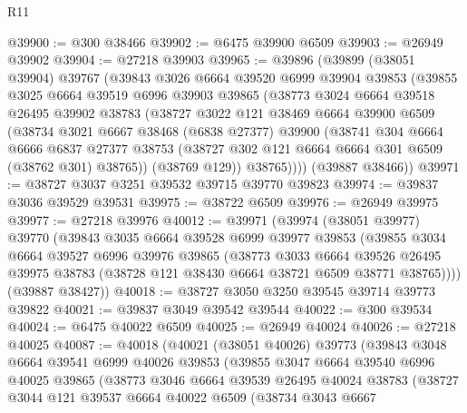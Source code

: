 \begin{lexlean}{R11}
\begin{coremodule}
@39900 := @300 @38466
@39902 := @6475 @39900 @6509
@39903 := @26949 @39902
@39904 := @27218 @39903
@39965 := @39896
    (@39899
      (@38051 @39904)
      @39767
      (@39843
        @3026
        @6664
        @39520
        @6999
        @39904
        @39853
        (@39855
          @3025
          @6664
          @39519
          @6996
          @39903
          @39865
          (@38773
            @3024
            @6664
            @39518
            @26495
            @39902
            @38783
            (@38727
              @3022
              @121
              @38469
              @6664
              @39900
              @6509
              (@38734
                @3021
                @6667
                @38468
                (@6838 @27377)
                @39900
                (@38741
                  @304
                  @6664
                  @6666
                  @6837
                  @27377
                  @38753
                  (@38727 @302 @121 @6664 @6664 @301 @6509 (@38762 @301) @38765))
                (@38769 @129))
              @38765))))
      (@39887 @38466))
@39971 := @38727 @3037 @3251 @39532 @39715 @39770 @39823
@39974 := @39837 @3036 @39529 @39531
@39975 := @38722 @6509
@39976 := @26949 @39975
@39977 := @27218 @39976
@40012 := @39971
    (@39974
      (@38051 @39977)
      @39770
      (@39843
        @3035
        @6664
        @39528
        @6999
        @39977
        @39853
        (@39855
          @3034
          @6664
          @39527
          @6996
          @39976
          @39865
          (@38773
            @3033
            @6664
            @39526
            @26495
            @39975
            @38783
            (@38728 @121 @38430 @6664 @38721 @6509 @38771 @38765))))
      (@39887 @38427))
@40018 := @38727 @3050 @3250 @39545 @39714 @39773 @39822
@40021 := @39837 @3049 @39542 @39544
@40022 := @300 @39534
@40024 := @6475 @40022 @6509
@40025 := @26949 @40024
@40026 := @27218 @40025
@40087 := @40018
    (@40021
      (@38051 @40026)
      @39773
      (@39843
        @3048
        @6664
        @39541
        @6999
        @40026
        @39853
        (@39855
          @3047
          @6664
          @39540
          @6996
          @40025
          @39865
          (@38773
            @3046
            @6664
            @39539
            @26495
            @40024
            @38783
            (@38727
              @3044
              @121
              @39537
              @6664
              @40022
              @6509
              (@38734
                @3043
                @6667

\end{coremodule}
\end{lexlean}
